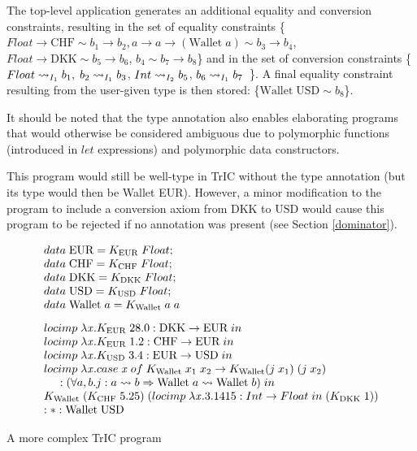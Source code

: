 The top-level application generates an additional equality and conversion constraints, resulting in the set of equality constraints \{$Float\to \text{CHF} \sim b_1 \to b_2, a \to a \to (\text{Wallet} \; a) \sim b_3 \to b_4$, $Float \to \text{DKK} \sim b_5 \to b_6$, $b_4 \sim b_7 \to b_8$\} and in the set of conversion constraints \{$\convX{\imEnv_1}{Float}{b_1},\; \convX{\imEnv_1}{b_2}{b_3}$,\; $\convX{\imEnv_2}{Int}{b_5}$,\; $\convX{\imEnv_1}{b_6}{b_7}$~\}. A final equality constraint resulting from the user-given type is then stored: \{$\text{Wallet} \; \text{USD} \sim b_8$\}.

It should be noted that the type annotation also enables elaborating programs that would otherwise be considered ambiguous due to polymorphic functions (introduced in $let$ expressions) and polymorphic data constructors.

This program would still be well-type in TrIC without the type annotation (but its type would then be Wallet EUR). However, a minor modification to the program to include a conversion axiom from $\text{DKK}$ to $\text{USD}$ would cause this program to be rejected if no annotation was present (see Section \ref{dominator}).


\begin{eg}
     \[
\begin{array}{@{\hspace{0mm}}l@{\hspace{0mm}}}
  data\;\text{EUR}=K_{\text{EUR}}\;Float;\\
  data\;\text{CHF}=K_{\text{CHF}}\;Float;\\
  data\;\text{DKK}=K_{\text{DKK}}\;Float;\\
  data\;\text{USD}=K_{\text{USD}}\;Float;\\
  data\;\text{Wallet}\;a =K_{\text{Wallet}}\;a\;a\\[3mm]
  
  \monolocal{\text{DKK}}{\text{EUR}}{\lambda \tmVar . K_{\text{EUR}}\; 28.0}\\
  \monolocal{\text{CHF}}{\text{EUR}}{\lambda \tmVar . K_{\text{EUR}}\; 1.2}\\
  \monolocal{\text{EUR}}{\text{USD}}{\lambda \tmVar . K_{\text{USD}}\; 3.4}\\
  locimp\;\lambda \tmVar. case\;\tmVar\; of\;K_{\text{Wallet}}\;x_1\;x_2 \to K_{\text{Wallet}} (j\;x_1)\;(j\;x_2)\; \\
  \phantom{xx} :(\forall a, b . j : a \rightsquigarrow b \Rightarrow \text{Wallet}\;a\rightsquigarrow \text{Wallet}\;b)\; in \\
  K_{\text{Wallet}}\;(K_{\text{CHF}}\; 5.25)\;(\monolocal{Int}{Float}{\lambda \tmVar.3.1415} (K_{\text{DKK}}\;1))
  \\
  :*: \text{Wallet} \; \text{USD}
\end{array}
\]
\caption{A more complex TrIC program}
\label{complex5}
\end{eg}


